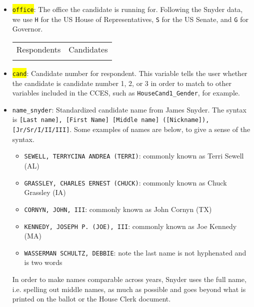 \documentclass[12pt]{article}
\begin{document}
\begin{itemize}[leftmargin=*]

\item \colorbox{yellow}{\texttt{office}}: The office the candidate is running for. Following the Snyder data, we use \texttt{H} for the US House of Representatives, \texttt{S} for the US Senate, and \texttt{G} for Governor. 

    \begin{tabularx}{\linewidth}{CC}
    Respondents & Candidates\\
     & 
    
    \end{tabularx}
			

\item \colorbox{yellow}{\texttt{cand}}: Candidate number for respondent. This variable tells the user whether the candidate is candidate number 1, 2, or 3 in order to match to other variables included in the CCES, such as \texttt{HouseCand1\_Gender}, for example.

\begin{center}

\end{center}


\item \texttt{name\_snyder}: Standardized candidate name from James Snyder.  The syntax is \texttt{[Last name], [First Name] [Middle name] ([Nickname]), [Jr/Sr/I/II/III]}.  Some examples of names are below, to give a sense of the syntax.

\begin{itemize}
	\item[] \texttt{SEWELL, TERRYCINA ANDREA (TERRI)}: commonly known as Terri Sewell (AL)
	\item[] \texttt{GRASSLEY, CHARLES ERNEST (CHUCK)}: commonly known as Chuck Grassley (IA)
	\item[] \texttt{CORNYN, JOHN, III}: commonly known as John Cornyn (TX)
	\item[] \texttt{KENNEDY, JOSEPH P. (JOE), III}: commonly known as Joe Kennedy (MA)
	\item[] \texttt{WASSERMAN SCHULTZ, DEBBIE}: note the last name is not hyphenated and is two words
\end{itemize}

In order to make names comparable across years, Snyder uses the full name, i.e. spelling out middle names, as much as possible and goes beyond what is printed on the ballot or the House Clerk document.


\end{itemize}
\end{document}
